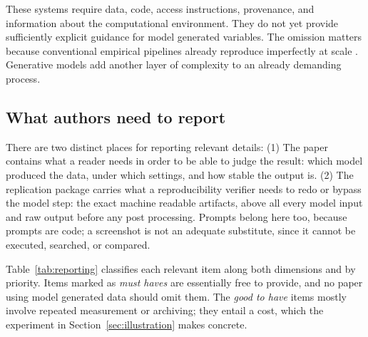 \documentclass[11pt]{article}
\begin{document}
These systems require data, code, access instructions, provenance, and information about the computational environment. They do not yet provide sufficiently explicit guidance for model generated variables. The omission matters because conventional empirical pipelines already reproduce imperfectly at scale \citep{perignon2024b}. Generative models add another layer of complexity to an already demanding process.\medskip



\subsection{What authors need to report}\label{sec:what-to-report}

There are two distinct places for reporting relevant details: (1) The paper contains what a reader needs in order to be able to judge the result: which model produced the data, under which settings, and how stable the output is. (2) The replication package carries what a reproducibility verifier needs to redo or bypass the model step: the exact machine readable artifacts, above all every model input and raw output before any post processing. Prompts belong here too, because prompts are code; a screenshot is not an adequate substitute, since it cannot be executed, searched, or compared.\medskip

Table~\ref{tab:reporting} classifies each relevant item along both dimensions and by priority. Items marked as \textit{must haves} are essentially free to provide, and no paper using model generated data should omit them. The \textit{good to have} items mostly involve repeated measurement or archiving; they entail a cost, which the experiment in Section~\ref{sec:illustration} makes concrete. %
\medskip
\end{document}
